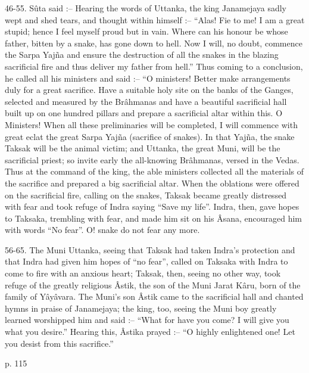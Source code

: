 46-55. Sûta said :-- Hearing the words of Uttanka, the king Janamejaya sadly wept and shed tears, and thought within himself :-- “Alas! Fie to me! I am a great stupid; hence I feel myself proud but in vain. Where can his honour be whose father, bitten by a snake, has gone down to hell. Now I will, no doubt, commence the Sarpa Yajña and ensure the destruction of all the snakes in the blazing sacrificial fire and thus deliver my father from hell.” Thus coming to a conclusion, he called all his ministers and said :-- “O ministers! Better make arrangements duly for a great sacrifice. Have a suitable holy site on the banks of the Ganges, selected and measured by the Brâhmanas and have a beautiful sacrificial hall built up on one hundred pillars and prepare a sacrificial altar within this. O Ministers! When all these preliminaries will be completed, I will commence with great eclat the great Sarpa Yajña (sacrifice of snakes). In that Yajña, the snake Taksak will be the animal victim; and Uttanka, the great Muni, will be the sacrificial priest; so invite early the all-knowing Brâhmanas, versed in the Vedas. Thus at the command of the king, the able ministers collected all the materials of the sacrifice and prepared a big sacrificial altar. When the oblations were offered on the sacrificial fire, calling on the snakes, Taksak became greatly distressed with fear and took refuge of Indra saying “Save my life”. Indra, then, gave hopes to Taksaka, trembling with fear, and made him sit on his Âsana, encouraged him with words “No fear”. O! snake do not fear any more.

 

 56-65. The Muni Uttanka, seeing that Taksak had taken Indra's protection and that Indra had given him hopes of “no fear”, called on Taksaka with Indra to come to fire with an anxious heart; Taksak, then, seeing no other way, took refuge of the greatly religious Âstik, the son of the Muni Jarat Kâru, born of the family of Yâyâvara. The Muni's son Âstik came to the sacrificial hall and chanted hymns in praise of Janamejaya; the king, too, seeing the Muni boy greatly learned worshipped him and said :-- “What for have you come? I will give you what you desire.” Hearing this, Âstika prayed :-- “O highly enlightened one! Let you desist from this sacrifice.”

 

p. 115

 


